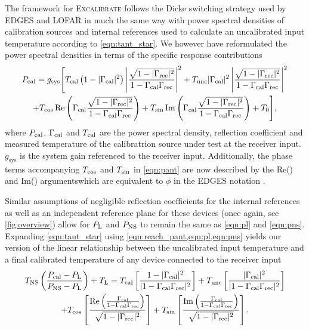 The framework for \textsc{Excalibrate} follows the Dicke switching strategy used by EDGES \citep{edgesCal} and LOFAR \citep{lofarCal} in much the same way with power spectral densities of calibration sources and internal references used to calculate an uncalibrated input temperature according to \cref{eqn:tant_star}. We however have reformulated the power spectral densities in terms of the specific response contributions
\begin{multline}
    \label{eqn:reach_pant}
    P_{\mathrm{cal}} = g_{\mathrm{sys}} \Bigg[ T_{\mathrm{cal}}\left(1-|\Gamma_{\mathrm{cal}}|^2\right)\left|\frac{\sqrt{1 - |\Gamma_{\mathrm{rec}}|^2}}{1-\Gamma_{\mathrm{cal}}\Gamma_{\mathrm{rec}}}\right|^2 + T_{\mathrm{unc}}|\Gamma_{\mathrm{cal}}|^2\left|\frac{\sqrt{1 - |\Gamma_{\mathrm{rec}}|^2}}{1-\Gamma_{\mathrm{cal}}\Gamma_{\mathrm{rec}}}\right|^2 \\
    + T_{\mathrm{cos}}\operatorname{Re}\left(\Gamma_{\mathrm{cal}}\frac{\sqrt{1 - |\Gamma_{\mathrm{rec}}|^2}}{1-\Gamma_{\mathrm{cal}}\Gamma_{\mathrm{rec}}}\right) + T_{\mathrm{sin}}\operatorname{Im}\left(\Gamma_{\mathrm{cal}}\frac{\sqrt{1 - |\Gamma_{\mathrm{rec}}|^2}}{1-\Gamma_{\mathrm{cal}}\Gamma_{\mathrm{rec}}}\right) + T_0 \Bigg],
\end{multline}
where $P_{\mathrm{cal}}$, $\Gamma_{\mathrm{cal}}$ and $T_{\mathrm{cal}}$ are the power spectral density, reflection coefficient and measured temperature of the calibratrion source under test at the receiver input. $g_{\mathrm{sys}}$ is the system gain referenced to the receiver input. Additionally, the phase terms accompanying $T_{\mathrm{cos}}$ and $T_{\mathrm{sin}}$ in \cref{eqn:pant} are now described by the Re() and Im() argumentswhich are equivalent to $\phi$ in the EDGES notation \cite{rogersCal}.

Similar assumptions of negligible reflection coefficients for the internal references as well as an independent reference plane for these devices (once again, see \cref{fig:overview}) allow for $P_{\mathrm{L}}$ and $P_{\mathrm{NS}}$ to remain the same as \cref{eqn:pl} and \cref{eqn:pns}. Expanding \cref{eqn:tant_star} using \cref{eqn:reach_pant,eqn:pl,eqn:pns} yields our version of the linear relationship between the uncalibrated input temperature and a final calibrated temperature of any device connected to the receiver input
\begin{multline}
    \label{eqn:caleqn}
    T_{\mathrm{NS}}\left( \frac{P_{\mathrm{cal}} - P_{\mathrm{L}}}{P_{\mathrm{NS}} - P_{\mathrm{L}}} \right) + T_{\mathrm{L}} = T_{\mathrm{cal}}\left[ \frac{1-|\Gamma_{\mathrm{cal}}|^2}{|1-\Gamma_{\mathrm{cal}}\Gamma_{\mathrm{rec}}|^2} \right] + T_{\mathrm{unc}}\left[ \frac{|\Gamma_{\mathrm{cal}}|^2}{|1-\Gamma_{\mathrm{cal}}\Gamma_{\mathrm{rec}}|^2} \right] \\
    + T_{\mathrm{cos}}\left[ \frac{\operatorname{Re}\left(\frac{\Gamma_{\mathrm{cal}}}{1-\Gamma_{\mathrm{cal}}\Gamma_{\mathrm{rec}}}\right)}{\sqrt{1-|\Gamma_{\mathrm{rec}}|^2}} \right] + T_{\mathrm{sin}}\left[ \frac{\operatorname{Im}\left(\frac{\Gamma_{\mathrm{cal}}}{1-\Gamma_{\mathrm{cal}}\Gamma_{\mathrm{rec}}}\right)}{\sqrt{1-|\Gamma_{\mathrm{rec}}|^2}} \right].
\end{multline}

